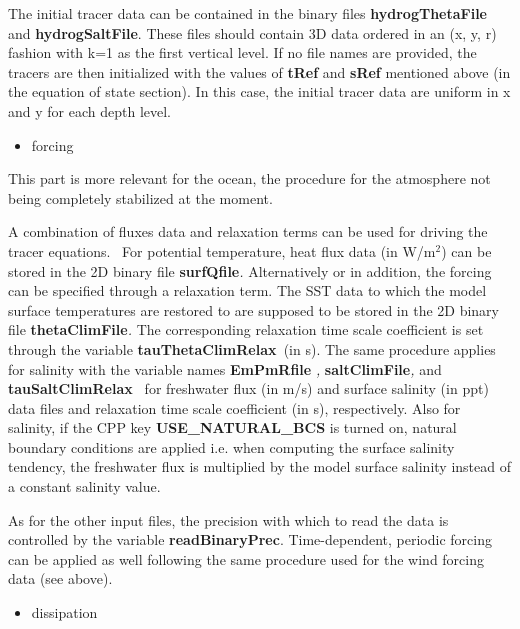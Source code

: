 The initial tracer data can be contained in the binary files \textbf{%
hydrogThetaFile }and \textbf{hydrogSaltFile}. These files should contain 3D
data ordered in an (x, y, r) fashion with k=1 as the first vertical level.
If no file names are provided, the tracers are then initialized with the
values of \textbf{tRef }and \textbf{sRef }mentioned above (in the equation
of state section). In this case, the initial tracer data are uniform in x
and y for each depth level.

\begin{itemize} 
\item forcing
\end{itemize}

This part is more relevant for the ocean, the procedure for the atmosphere
not being completely stabilized at the moment.

A combination of fluxes data and relaxation terms can be used for driving
the tracer equations. \ For potential temperature, heat flux data (in W/m$%
^{2}$) can be stored in the 2D binary file \textbf{surfQfile}\textit{. }%
Alternatively or in addition, the forcing can be specified through a
relaxation term. The SST data to which the model surface temperatures are
restored to are supposed to be stored in the 2D binary file \textbf{%
thetaClimFile}\textit{. }The corresponding relaxation time scale coefficient
is set through the variable \textbf{tauThetaClimRelax}\textit{\ }(in s). The
same procedure applies for salinity with the variable names \textbf{EmPmRfile%
}\textit{, }\textbf{saltClimFile}\textit{, }and \textbf{tauSaltClimRelax}%
\textit{\ }for freshwater flux (in m/s) and surface salinity (in ppt) data
files and relaxation time scale coefficient (in s), respectively. Also for
salinity, if the CPP key \textbf{USE\_NATURAL\_BCS} is turned on, natural
boundary conditions are applied i.e. when computing the surface salinity
tendency, the freshwater flux is multiplied by the model surface salinity
instead of a constant salinity value.

As for the other input files, the precision with which to read the data is
controlled by the variable \textbf{readBinaryPrec}. Time-dependent, periodic
forcing can be applied as well following the same procedure used for the
wind forcing data (see above).

\begin{itemize}
\item dissipation
\end{itemize}

